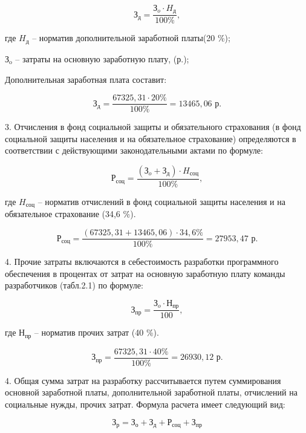 \begin{equation}
    \text{З}_{\text{д}} = \frac{\text{З}_{o}\cdot H_\text{д}}{100\%},
\end{equation}


где $H_\text{д}$ -- норматив дополнительной              заработной платы(20 \%);

   $\text{З}_{\text{o}}$ -- затраты на основную заработную плату, (р.);




Дополнительная заработная плата составит:

$$
\text{З}_{\text{д}} = \frac{67325,31 \cdot 20\%}{100\%} = 13465,06 \text{ р}.
$$

3. Отчисления в фонд социальной защиты и обязательного страхования (в фонд социальной защиты населения и на обязательное страхование) определяются в соответствии с действующими законодательными актами по формуле: 

\begin{equation}
    \text{Р}_{\text{соц}} = \frac{(\text{З}_{o} + \text{З}_{\text{д}})\cdot H_\text{соц}}{100\%},
\end{equation}
 
где $H_\text{соц}$ -- норматив отчислений в фонд социальной защиты населения и на обязательное страхование (34,6 \%).
 
$$
 \text{Р}_{\text{соц}} = \frac{(67325,31 + 13465,06)\cdot 34,6\%}{100\%} = 27953,47 \text{ р}.
$$

4. Прочие затраты включаются в себестоимость разработки программного обеспечения в процентах от затрат на основную заработную плату команды разработчиков (табл.2.1) по формуле:

\begin{equation}
    \text{З}_{\text{пр}} = \frac{\text{З}_{o} \cdot \text{Н}_{\text{пр}}}{100},
\end{equation}

где $\text{Н}_{\text{пр}}$ -- норматив прочих затрат (40 \%).

$$
 \text{З}_{\text{пр}} = \frac{67325,31 \cdot 40\%}{100\%} = 26930,12 \text{ р}.
$$

4. Общая сумма затрат на разработку рассчитывается путем суммирования основной заработной платы,
дополнительной заработной платы, отчислений на социальные нужды, прочих затрат. Формула расчета имеет следующий вид:

$$
 \text{З}_{\text{р}} =\text{З}_{\text{о}} + \text{З}_{\text{д}} + \text{Р}_{\text{соц}} + \text{З}_{\text{пр}}
$$

